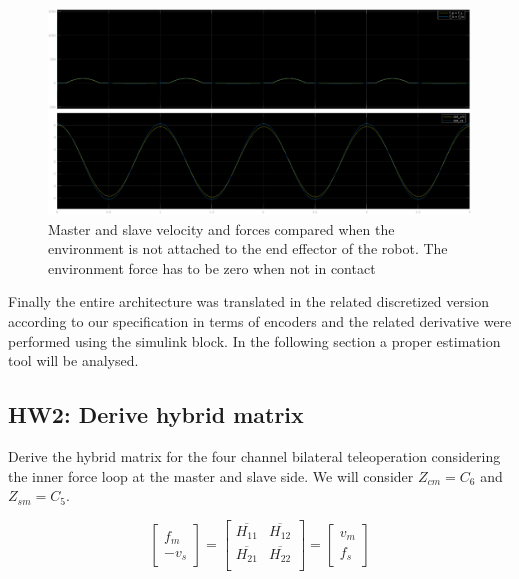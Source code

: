 \documentclass[a4paper,12pt]{article}
\begin{document}
\begin{figure}[H]
    \begin{center}
        \hspace*{-2cm}
        \includegraphics[scale=0.39]{images/hw1_forces.eps}
    \end{center}
    \caption{Master and slave velocity and forces compared when the environment is not attached to the end effector of the robot. The environment force has to be zero when not in contact}
    \label{fig:hw1_forces}
\end{figure}

\noindent Finally the entire architecture was translated in the related discretized version according to our specification in terms of encoders and the related derivative were performed using the simulink block. In the following section a proper estimation tool will be analysed.

\subsection{HW2: Derive hybrid matrix}

Derive the hybrid matrix for the four channel bilateral teleoperation considering the inner force loop at the master and slave side. We will consider $Z_{cm} = C_{6}$ and $Z_{sm} = C_{5}$. 

\[
\begin{bmatrix}  f_m \\ -v_s \end{bmatrix} = \begin{bmatrix}
    \overline{H_{11}} & \overline{H_{12}} \\
    \overline{H_{21}} &  \overline{H_{22}} \\
\end{bmatrix} = \begin{bmatrix}  v_m \\ f_s \end{bmatrix}
\]
\end{document}
